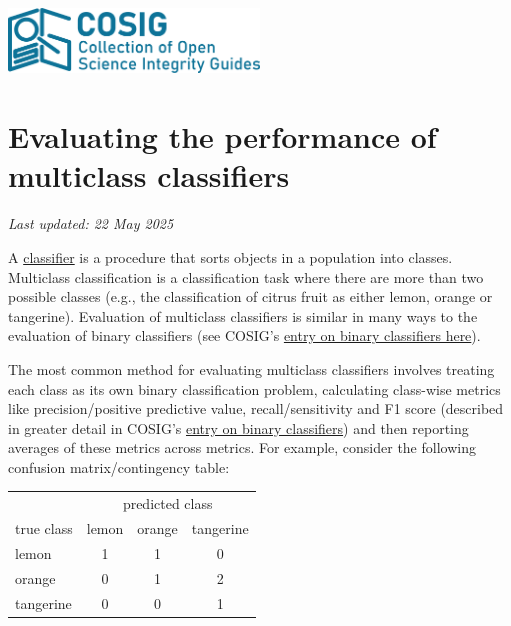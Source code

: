 \documentclass[letterpaper, 12pt]{article}
\begin{document}
\flushleft
\includegraphics[width=0.5\textwidth]{img/home/241017_final_logo_mockup.png}

\section*{Evaluating the performance of multiclass classifiers}
\textit{Last updated: 22 May 2025}

A \href{https://en.wikipedia.org/wiki/Classification_rule}{classifier} is a procedure that sorts objects in a population into classes. Multiclass classification is a classification task where there are more than two possible classes (e.g., the classification of citrus fruit as either lemon, orange or tangerine). Evaluation of multiclass classifiers is similar in many ways to the evaluation of binary classifiers (see COSIG's \href{https://osf.io/pvr4a}{entry on binary classifiers here}).

The most common method for evaluating multiclass classifiers involves treating each class as its own binary classification problem, calculating class-wise metrics like precision/positive predictive value, recall/sensitivity and F1 score (described in greater detail in COSIG's \href{https://osf.io/pvr4a}{entry on binary classifiers}) and then reporting averages of these metrics across metrics. For example, consider the following confusion matrix/contingency table:

\begin{center}
\begin{tabular}{l|ccc}
& \multicolumn{3}{c}{predicted class} \\
true class & lemon & orange & tangerine \\
\hline
lemon & 1 & 1 & 0\\
orange & 0 & 1 & 2\\
tangerine & 0 & 0 & 1\\
\end{tabular}
\end{center}
\end{document}
